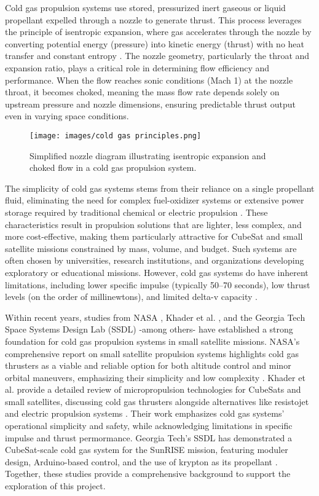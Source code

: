 \documentclass{new-aiaa}
\begin{document}
Cold gas propulsion systems use stored, pressurized inert gaseous or liquid propellant expelled through a nozzle to generate thrust. This process leverages the principle of isentropic expansion, where gas accelerates through the nozzle by converting potential energy (pressure) into kinetic energy (thrust) with no heat transfer and constant entropy \cite{nasa2021}. The nozzle geometry, particularly the throat and expansion ratio, plays a critical role in determining flow efficiency and performance. When the flow reaches sonic conditions (Mach 1) at the nozzle throat, it becomes choked, meaning the mass flow rate depends solely on upstream pressure and nozzle dimensions, ensuring predictable thrust output even in varying space conditions. 
\begin{figure}[h!]
    \centering
    \texttt{[image: images/cold gas principles.png]}
    \caption{Simplified nozzle diagram illustrating isentropic expansion and choked flow in a cold gas propulsion system.}
    \label{fig:nozzle}
\end{figure}

The simplicity of cold gas systems stems from their reliance on a single propellant fluid, eliminating the need for complex fuel-oxidizer systems or extensive power storage required by traditional chemical or electric propulsion \cite{nasa2021}. These characteristics result in propulsion solutions that are lighter, less complex, and more cost-effective, making them particularly attractive for CubeSat and small satellite missions constrained by mass, volume, and budget. Such systems are often chosen by universities, research institutions, and organizations developing exploratory or educational missions. However, cold gas systems do have inherent limitations, including lower specific impulse (typically 50–70 seconds), low thrust levels (on the order of millinewtons), and limited delta-v capacity \cite{khader2018space}.

Within recent years, studies from NASA \cite{nasa2021}, Khader et al. \cite{khader2018space}, and the Georgia Tech Space Systems Design Lab (SSDL) \cite{skidmore2016}-among others- have established a strong foundation for cold gas propulsion systems in small satellite missions. NASA's comprehensive report on small satellite propulsion systems highlights cold gas thrusters as a viable and reliable option for both altitude control and minor orbital maneuvers, emphasizing their simplicity and low complexity \cite{nasa2021}. Khader et al. provide a detailed review of micropropulsion technologies for CubeSats and small satellites, discussing cold gas thrusters alongside alternatives like resistojet and electric propulsion systems \cite{khader2018space}. Their work emphasizes cold gas systems' operational simplicity and safety, while acknowledging limitations in specific impulse and thrust permormance. Georgia Tech's SSDL has demonstrated a CubeSat-scale cold gas system for the SunRISE mission, featuring moduler design, Arduino-based control, and the use of krypton as its propellant \cite{skidmore2016}. Together, these studies provide a comprehensive background to support the exploration of this project. 
\end{document}
